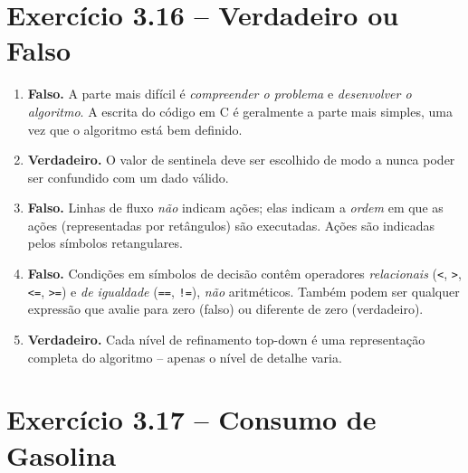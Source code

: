 \documentclass[12pt,a4paper]{article}
\begin{document}
\newpage

\section{Exercício 3.16 -- Verdadeiro ou Falso}

\begin{respostabox}
\begin{enumerate}[label=\textbf{\alph*)}]

\item \textcolor{deitelred}{\textbf{Falso.}} A parte mais difícil é \textit{compreender o
problema} e \textit{desenvolver o algoritmo}. A escrita do código em C é geralmente
a parte mais simples, uma vez que o algoritmo está bem definido.

\item \textcolor{deitelgreen}{\textbf{Verdadeiro.}} O valor de sentinela deve ser
escolhido de modo a nunca poder ser confundido com um dado válido.

\item \textcolor{deitelred}{\textbf{Falso.}} Linhas de fluxo \textit{não} indicam ações;
elas indicam a \textit{ordem} em que as ações (representadas por retângulos) são executadas.
Ações são indicadas pelos símbolos retangulares.

\item \textcolor{deitelred}{\textbf{Falso.}} Condições em símbolos de decisão contêm
operadores \textit{relacionais} (\texttt{<}, \texttt{>}, \texttt{<=}, \texttt{>=}) e
\textit{de igualdade} (\texttt{==}, \texttt{!=}), \textit{não} aritméticos. Também podem
ser qualquer expressão que avalie para zero (falso) ou diferente de zero (verdadeiro).

\item \textcolor{deitelgreen}{\textbf{Verdadeiro.}} Cada nível de refinamento top-down
é uma representação completa do algoritmo -- apenas o nível de detalhe varia.

\end{enumerate}
\end{respostabox}

\section{Exercício 3.17 -- Consumo de Gasolina}
\end{document}

